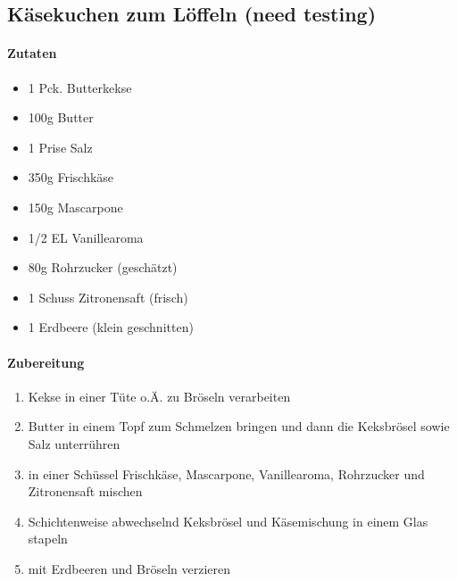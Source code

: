 \newpage
\subsection{Käsekuchen zum Löffeln (need testing)}
\paragraph{Zutaten}
\begin{itemize}[noitemsep]
	\item 1 Pck. Butterkekse
	\item 100g Butter
	\item 1 Prise Salz
	\item 350g Frischkäse
	\item 150g Mascarpone
	\item 1/2 EL Vanillearoma 
	\item 80g Rohrzucker (geschätzt)
	\item 1 Schuss Zitronensaft (frisch)
	\item 1 Erdbeere (klein geschnitten)
\end{itemize}
\paragraph{Zubereitung}
\begin{enumerate}[noitemsep]
	\item Kekse in einer Tüte o.Ä. zu Bröseln verarbeiten
	\item Butter in einem Topf zum Schmelzen bringen und dann die Keksbrösel sowie Salz unterrühren
	\item in einer Schüssel Frischkäse, Mascarpone, Vanillearoma, Rohrzucker und Zitronensaft mischen  
	\item Schichtenweise abwechselnd Keksbrösel und Käsemischung in einem Glas stapeln 
	\item mit Erdbeeren und Bröseln verzieren
\end{enumerate}
